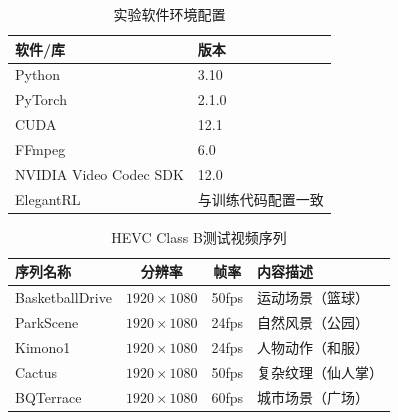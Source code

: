 \begin{table}[htbp]
  \centering
  \caption{实验软件环境配置}
  \label{tab:software}
  \begin{tabular}{ll}
    \toprule
    \textbf{软件/库} & \textbf{版本} \\
    \midrule
    Python       & 3.10 \\
    PyTorch\cite{ref60-paszke2019pytorch}      & 2.1.0 \\
    CUDA         & 12.1 \\
    FFmpeg\cite{ref58-ffmpegproject}       & 6.0 \\
    NVIDIA Video Codec SDK\cite{ref59-nvidiasdk} & 12.0 \\
    ElegantRL\cite{ref26-liu2021elegantrl} & 与训练代码配置一致 \\
    \bottomrule
  \end{tabular}
\end{table}

\begin{table}[htbp]
  \centering
  \caption{HEVC Class B测试视频序列}
  \label{tab:sequences}
  \begin{tabular}{lccl}
    \toprule
    \textbf{序列名称} & \textbf{分辨率} & \textbf{帧率} & \textbf{内容描述} \\
    \midrule
    BasketballDrive  & $1920 \times 1080$ & 50fps  & 运动场景（篮球） \\
    ParkScene        & $1920 \times 1080$ & 24fps  & 自然风景（公园） \\
    Kimono1          & $1920 \times 1080$ & 24fps  & 人物动作（和服） \\
    Cactus           & $1920 \times 1080$ & 50fps  & 复杂纹理（仙人掌） \\
    BQTerrace        & $1920 \times 1080$ & 60fps  & 城市场景（广场） \\
    \bottomrule
  \end{tabular}
\end{table}

